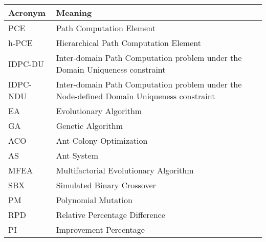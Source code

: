 \fontsize{13}{16}
\selectfont
\begin{center}
	\begin{tabular}{|p{1in}|p{5in}|}
		\hline
		\textbf{Acronym} & \textbf{Meaning}  \\ \hline
		PCE & Path Computation Element	\\ \hline
		h-PCE & Hierarchical Path Computation Element	\\ \hline
		IDPC-DU & Inter-domain Path Computation problem under the Domain Uniqueness constraint \\ \hline
		IDPC-NDU & Inter-domain Path Computation problem under the Node-defined Domain Uniqueness constraint \\ \hline
		EA & Evolutionary Algorithm \\ \hline
		GA & Genetic Algorithm  \\ \hline
		ACO & Ant Colony Optimization \\ \hline
		AS & Ant System \\ \hline
		MFEA & Multifactorial Evolutionary Algorithm \\ \hline
		SBX & Simulated Binary Crossover\\ \hline
		PM & Polynomial Mutation\\ \hline
		RPD & Relative Percentage Difference\\ \hline
		PI & Improvement Percentage\\ \hline
	\end{tabular}    
\end{center}


\pagebreak